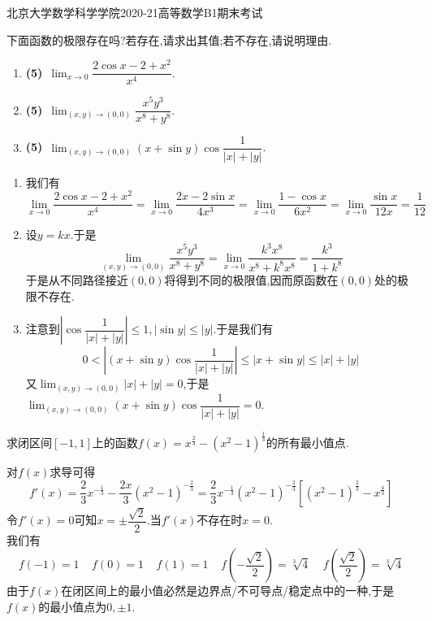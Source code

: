 \documentclass{ctexart}
\begin{document}
\pagestyle{empty}
\begin{center}\Large
    北京大学数学科学学院2020-21高等数学B1期末考试
\end{center}
\begin{problem}[1.(15\songti{分})]
    下面函数的极限存在吗?若存在,请求出其值;若不存在,请说明理由.
    \begin{enumerate}[label=\textbf{(\arabic*)},leftmargin=*]
        \item \textbf{(5)}\ $\displaystyle\lim_{x\to0}\dfrac{2\cos x-2+x^2}{x^4}$.
        \item \textbf{(5)}\ $\displaystyle\lim_{(x,y)\to(0,0)}\dfrac{x^5y^3}{x^8+y^8}$.
        \item \textbf{(5)}\ $\displaystyle\lim_{(x,y)\to(0,0)}(x+\sin y)\cos\dfrac{1}{|x|+|y|}$.
    \end{enumerate}
\end{problem}
\begin{solution}
    \begin{enumerate}[label=\textbf{(\arabic*)},leftmargin=*]
        \item 我们有
            \[\lim_{x\to0}\dfrac{2\cos x-2+x^2}{x^4}=\lim_{x\to0}\dfrac{2x-2\sin x}{4x^3}=\lim_{x\to0}\dfrac{1-\cos x}{6x^2}=\lim_{x\to0}\dfrac{\sin x}{12 x}=\dfrac1{12}\]
        \item 设$y=kx$.于是
            \[\lim_{(x,y)\to(0,0)}\dfrac{x^5y^3}{x^8+y^8}=\lim_{x\to0}\dfrac{k^3x^8}{x^8+k^8x^8}=\dfrac{k^3}{1+k^8}\]
            于是从不同路径接近$(0,0)$将得到不同的极限值,因而原函数在$(0,0)$处的极限不存在.
        \item 注意到$\left|\cos\dfrac{1}{|x|+|y|}\right|\leqslant1,|\sin y|\leqslant|y|$.于是我们有
            \[0<\left|(x+\sin y)\cos\dfrac{1}{|x|+|y|}\right|\leqslant\left|x+\sin y\right|\leqslant|x|+|y|\]
            又$\displaystyle\lim_{(x,y)\to(0,0)}|x|+|y|=0$,于是$\displaystyle\lim_{(x,y)\to(0,0)}(x+\sin y)\cos\dfrac{1}{|x|+|y|}=0$.
    \end{enumerate}
\end{solution}
\begin{problem}[2.(15\songti{分})]
    求闭区间$[-1,1]$上的函数$f(x)=x^{\frac23}-\left(x^2-1\right)^\frac13$的所有最小值点.
\end{problem}
\begin{solution}
    对$f(x)$求导可得
    \[f'(x)=\dfrac23x^{-\frac13}-\dfrac{2x}3(x^2-1)^{-\frac23}=\dfrac{2}{3}x^{-\frac13}(x^2-1)^{-\frac23}\left[(x^2-1)^{\frac23}-x^{\frac43}\right]\]
    令$f'(x)=0$可知$x=\pm\dfrac{\sqrt2}{2}$.当$f'(x)$不存在时$x=0$.\\
    我们有
    \[f(-1)=1\ \ \ \ \ f(0)=1\ \ \ \ \ f(1)=1\ \ \ \ \ f\left(-\dfrac{\sqrt2}{2}\right)=\sqrt[3]{4}\ \ \ \ \ f\left(\dfrac{\sqrt2}{2}\right)=\sqrt[3]{4}\]
    由于$f(x)$在闭区间上的最小值必然是边界点/不可导点/稳定点中的一种,于是$f(x)$的最小值点为$0,\pm1$.
\end{solution}
\end{document}
